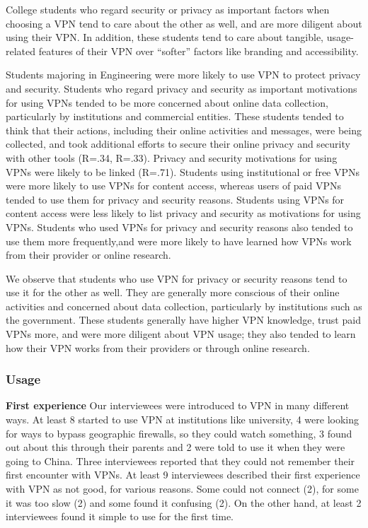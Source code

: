  
College students who regard security or privacy as important factors when
choosing a VPN tend to care about the other as well, and are more diligent
about using their VPN. In addition, these students tend to care about
tangible, usage-related features of their VPN over “softer” factors like
branding and accessibility.

Students majoring in Engineering were more likely to use VPN to protect
privacy and security. Students who regard privacy and security as important
motivations for using VPNs tended to be more concerned about online data
collection, particularly by institutions and commercial entities. These
students tended to think that their actions, including their online activities
and messages, were being collected, and took additional efforts to secure
their online privacy and security with other tools (R=.34, R=.33). Privacy and
security motivations for using VPNs were likely to be linked (R=.71). Students
using institutional or free VPNs were more likely to use VPNs for content
access, whereas users of paid VPNs tended to use them for privacy and security
reasons. Students using VPNs for content access were less likely to list
privacy and security as motivations for using VPNs. Students who used VPNs for
privacy and security reasons also tended to use them more frequently,and were
more likely to have learned how VPNs work from their provider or online
research. 

We observe that students who use VPN for privacy or security reasons tend to
use it for the other as well. They are generally more conscious of their
online activities and concerned about data collection, particularly by
institutions such as the government. These students generally have higher VPN
knowledge, trust paid VPNs more, and were more diligent about VPN usage; they
also tended to learn how their VPN works from their providers or through
online research.






\subsubsection{Usage} \textbf{First experience} Our interviewees were
introduced to VPN in many different ways. At least 8 started to use VPN at
institutions like university, 4 were looking for ways to bypass geographic
firewalls, so they could watch something, 3 found out about this through their
parents and 2 were told to use it when they were going to China. Three
interviewees reported that they could not remember their first encounter with
VPNs.  At least 9 interviewees described their first experience with VPN as
not good, for various reasons. Some could not connect (2), for some it was too
slow (2) and some found it confusing (2).  On the other hand, at least 2
interviewees found it simple to use for the first time. 

